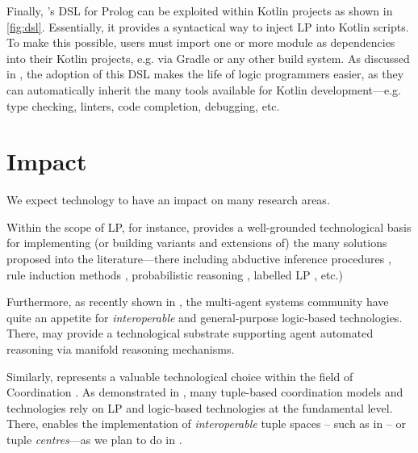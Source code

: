 \documentclass[12pt,a4paper,openright,twoside]{book}
\begin{document}

Finally, \twopkt{}'s DSL for Prolog can be exploited within Kotlin projects as shown in \cref{fig:dsl}.
%
Essentially, it provides a syntactical way to inject LP into Kotlin scripts.
%
To make this possible, users must import one or more  module as dependencies into their Kotlin projects, e.g. via Gradle or any other build system.
%
As discussed in \cite{kotlindsi4prolog-woa2020}, the adoption of this DSL makes the life of logic programmers easier, as they can automatically inherit the many tools available for Kotlin development---e.g. type checking, linters, code completion, debugging, etc.


\section{Impact}
\label{sec:impact}

We expect \twopkt{} technology to have an impact on many research areas.

Within the scope of LP, for instance, \twopkt{} provides a well-grounded technological basis for implementing (or building variants and extensions of) the many solutions proposed into the literature---there including abductive inference procedures \cite{FungIff97}, rule induction methods \cite{Muggleton94}, probabilistic reasoning \cite{RaedtK15}, labelled LP \cite{labelledlp-fi161}, etc.)

Furthermore, as recently shown in \cite{lptech4mas-jaamas35}, the multi-agent systems community have quite an appetite for  \emph{interoperable} and general-purpose logic-based technologies.
%
There, \twopkt{} may provide a technological substrate supporting agent automated reasoning via manifold reasoning mechanisms.

Similarly, \twopkt{} represents a valuable technological choice within the field of Coordination \cite{MaloneC94}.
%
As demonstrated in \cite{coordination-jlamp2020}, many tuple-based coordination models and technologies rely on LP and logic-based technologies at the fundamental level.
%
There, \twopkt{} enables the implementation of \emph{interoperable} \linda{} tuple spaces -- such as in \tusow{} \cite{tusow-icccn2019} -- or tuple \emph{centres}---as we plan to do in \tucson{} \cite{tucson-jaamas2}.
\end{document}
